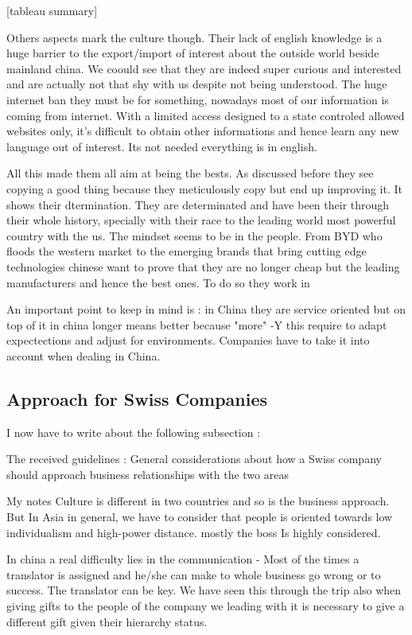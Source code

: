         [tableau summary]
        
        Others aspects mark the culture though. Their lack of english knowledge is a huge barrier to the export/import of interest about the outside world beside mainland china. We coould see that they are indeed super curious and interested and are actually not that shy with us despite not being understood. The huge internet ban they must be for something, nowadays most of our information is coming from internet. With a limited access designed to a state controled allowed websites only, it's difficult to obtain other informations and hence learn any new language out of interest. Its not needed everything is in english. 
        
        All this made them all aim at being the bests. As discussed before they see copying a good thing because they meticulously copy but end up improving it. It shows their dtermination. They are determinated and have been their through their whole history, specially with their race to the leading world most powerful country with the us. The mindset seems to be in the people. From BYD who floods the western market to the emerging brands that bring cutting edge technologies chinese want to prove that they are no longer cheap but the leading manufacturers and hence the best ones. To do so they work in 
        
        An important point to keep in mind is : in China they are service oriented but on top of it in china longer means better because "more" -Y this require to adapt expectections and adjust for environments. Companies have to take it into account when dealing in China. 


\subsection{Approach for Swiss Companies}
I now have to write about the following subsection : 

The received guidelines : 
General considerations about how a Swiss company should approach business relationships with the two areas


My notes 
Culture is different in two countries and so is the business approach. But In Asia in general, we have to consider that  people is oriented towards low individualism and high-power distance. mostly the boss Is highly considered. 

In china a real difficulty lies in the communication - Most of the times a translator is assigned and he/she can make to whole business go wrong or to success. The translator can be key. We have seen this through the trip also when giving gifts to the people of the company we leading with it is necessary to give a different gift given their hierarchy status. 

